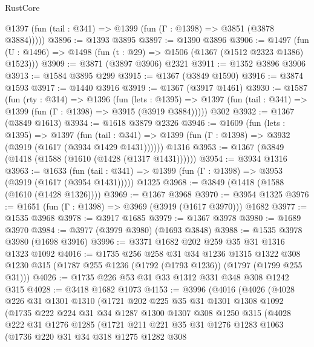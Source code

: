 \begin{lexlean}{RustCore}
\begin{coremodule}
      @1397 (fun (tail : @341) => @1399 (fun (Γ : @1398) => @3851 (@3878 @3884)))))
@3896 := @1393 @3895
@3897 := @1390 @3896
@3906 := @1497 (fun (U : @1496) => @1498 (fun (t : @29) => @1506 (@1367 (@1512 @2323 @1386) @1523)))
@3909 := @3871 (@3897 @3906) @2321
@3911 := @1352 @3896 @3906
@3913 := @1584 @3895 @299
@3915 := @1367 (@3849 @1590)
@3916 := @3874 @1593
@3917 := @1440 @3916
@3919 := @1367 (@3917 @1461)
@3930 := @1587
    (fun (rty : @314) =>
    @1396
      (fun (lets : @1395) =>
      @1397 (fun (tail : @341) => @1399 (fun (Γ : @1398) => @3915 (@3919 @3884)))))
    @302
@3932 := @1367 (@3849 @1613)
@3934 := @1618 @3879 @2326
@3946 := @1609
    (fun (lets : @1395) =>
    @1397
      (fun (tail : @341) => @1399 (fun (Γ : @1398) => @3932 (@3919 (@1617 (@3934 @1429 @1431))))))
    @1316
@3953 := @1367 (@3849 (@1418 (@1588 (@1610 (@1428 (@1317 @1431))))))
@3954 := @3934 @1316
@3963 := @1633
    (fun (tail : @341) => @1399 (fun (Γ : @1398) => @3953 (@3919 (@1617 (@3954 @1431)))))
    @1325
@3968 := @3849 (@1418 (@1588 (@1610 (@1428 @1326))))
@3969 := @1367 @3968
@3970 := @3954 @1325
@3976 := @1651 (fun (Γ : @1398) => @3969 (@3919 (@1617 @3970))) @1682
@3977 := @1535 @3968
@3978 := @3917 @1685
@3979 := @1367 @3978
@3980 := @1689 @3970
@3984 := @3977 (@3979 @3980) (@1693 @3848)
@3988 := @1535 @3978 @3980 (@1698 @3916)
@3996 := @3371 @1682 @202 @259 @35 @31 @1316 @1323 @1092
@4016 := @1735
    @256
    @258
    @31
    @34
    @1236
    @1315
    @1322
    @308
    @1230
    @315
    (@1787 @255 @1236 (@1792 (@1793 @1236)) (@1797 (@1799 @255 @31)))
@4026 := @1735 @226 @53 @31 @33 @1312 @331 @348 @308 @1242 @315
@4028 := @3418 @1682 @1073
@4153 := @3996
    (@4016
      (@4026
        (@4028
          @226
          @31
          @1301
          @1310
          (@1721
            @202
            @225
            @35
            @31
            @1301
            @1308
            @1092
            (@1735
              @222
              @224
              @31
              @34
              @1287
              @1300
              @1307
              @308
              @1250
              @315
              (@4028
                @222
                @31
                @1276
                @1285
                (@1721
                  @211
                  @221
                  @35
                  @31
                  @1276
                  @1283
                  @1063
                  (@1736
                    @220
                    @31
                    @34
                    @318
                    @1275
                    @1282
                    @308

\end{coremodule}
\end{lexlean}
